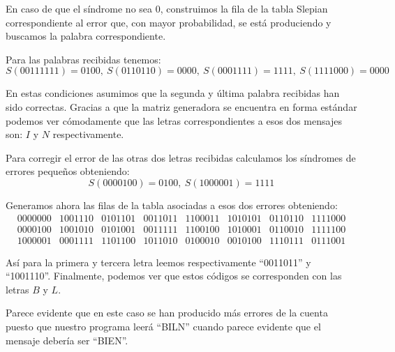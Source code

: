 \begin{problem}[4]
En caso de que el síndrome no sea 0, construimos la fila de la tabla Slepian correspondiente al error que, con mayor probabilidad, se está produciendo y buscamos la palabra correspondiente.

Para las palabras recibidas tenemos:
\[S(00111111) = 0100, \ S(0110110) = 0000, \ S(0001111)=1111, \ S(1111000) = 0000\]

En estas condiciones asumimos que la segunda y última palabra recibidas han sido correctas. Gracias a que la matriz generadora se encuentra en forma estándar podemos ver cómodamente que las letras correspondientes a esos dos mensajes son: $I$ y $N$ respectivamente.

Para corregir el error de las otras dos letras recibidas calculamos los síndromes de errores pequeños obteniendo:
\[S(0000100) = 0100, \ S(1000001)=1111\]

Generamos ahora las filas de la tabla asociadas a esos dos errores obteniendo:
\[\begin{array}{cccccccc}
0000000 & 1001110 & 0101101 & 0011011 & 1100011 & 1010101 & 0110110 & 1111000 \\
0000100 & 1001010 & 0101001 & 0011111 & 1100100 & 1010001 & 0110010 & 1111100 \\
1000001 & 0001111 & 1101100 & 1011010 & 0100010 & 0010100 & 1110111 & 0111001 \end{array}\]

Así para la primera y tercera letra leemos respectivamente ``0011011'' y ``1001110''. Finalmente, podemos ver que estos códigos se corresponden con las letras $B$ y $L$.

Parece evidente que en este caso se han producido más errores de la cuenta puesto que nuestro programa leerá ``BILN'' cuando parece evidente que el mensaje debería ser ``BIEN''.
\end{problem}

